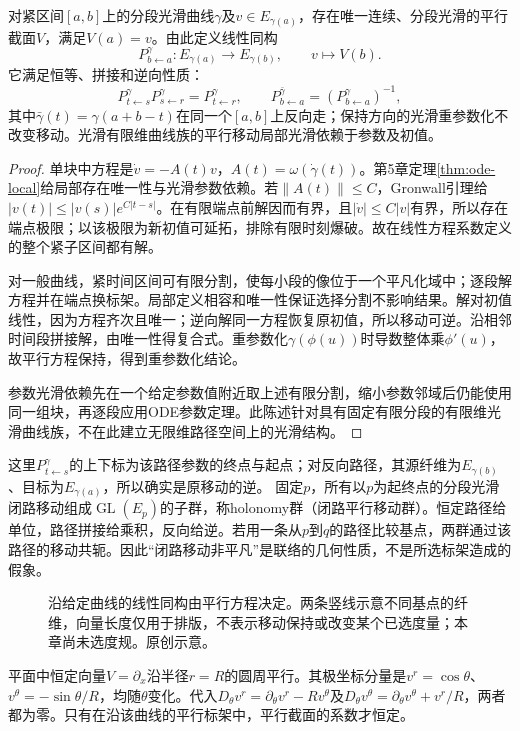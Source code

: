 \begin{theorem}[平行移动的存在与基本性质]\label{thm:parallel-transport}
对紧区间$[a,b]$上的分段光滑曲线$\gamma$及$v\in E_{\gamma(a)}$，存在唯一连续、分段光滑的平行截面$V$，满足$V(a)=v$。由此定义线性同构
\[
 P^\gamma_{b\leftarrow a}:E_{\gamma(a)}\to E_{\gamma(b)},\qquad v\mapsto V(b).
\]
它满足恒等、拼接和逆向性质：
\[
 P^\gamma_{t\leftarrow s}P^\gamma_{s\leftarrow r}=P^\gamma_{t\leftarrow r},
 \qquad P^{\bar\gamma}_{b\leftarrow a}=(P^\gamma_{b\leftarrow a})^{-1},
\]
其中$\bar\gamma(t)=\gamma(a+b-t)$在同一个$[a,b]$上反向走；保持方向的光滑重参数化不改变移动。光滑有限维曲线族的平行移动局部光滑依赖于参数及初值。
\end{theorem}
\begin{proof}
单块中方程是$\dot v=-A(t)v$，$A(t)=\omega(\dot\gamma(t))$。第5章定理\ref{thm:ode-local}给局部存在唯一性与光滑参数依赖。若$\|A(t)\|\leq C$，Gronwall引理给$|v(t)|\leq|v(s)|e^{C|t-s|}$。在有限端点前解因而有界，且$|\dot v|\leq C|v|$有界，所以存在端点极限；以该极限为新初值可延拓，排除有限时刻爆破。故在线性方程系数定义的整个紧子区间都有解。

对一般曲线，紧时间区间可有限分割，使每小段的像位于一个平凡化域中；逐段解方程并在端点换标架。局部定义相容和唯一性保证选择分割不影响结果。解对初值线性，因为方程齐次且唯一；逆向解同一方程恢复原初值，所以移动可逆。沿相邻时间段拼接解，由唯一性得复合式。重参数化$\gamma(\phi(u))$时导数整体乘$\phi'(u)$，故平行方程保持，得到重参数化结论。

参数光滑依赖先在一个给定参数值附近取上述有限分割，缩小参数邻域后仍能使用同一组块，再逐段应用ODE参数定理。此陈述针对具有固定有限分段的有限维光滑曲线族，不在此建立无限维路径空间上的光滑结构。
\end{proof}
这里$P^\gamma_{t\leftarrow s}$的上下标为该路径参数的终点与起点；对反向路径，其源纤维为$E_{\gamma(b)}$、目标为$E_{\gamma(a)}$，所以确实是原移动的逆。
固定$p$，所有以$p$为起终点的分段光滑闭路移动组成$\operatorname{GL}(E_p)$的子群，称holonomy群（闭路平行移动群）。恒定路径给单位，路径拼接给乘积，反向给逆。若用一条从$p$到$q$的路径比较基点，两群通过该路径的移动共轭。因此“闭路移动非平凡”是联络的几何性质，不是所选标架造成的假象。
\begin{figure}[htbp]
\centering
\caption{沿给定曲线的线性同构由平行方程决定。两条竖线示意不同基点的纤维，向量长度仅用于排版，不表示移动保持或改变某个已选度量；本章尚未选度规。原创示意。}
\label{fig:parallel-transport}
\end{figure}

\begin{example}[平行不等于分量恒定]
平面中恒定向量$V=\partial_x$沿半径$r=R$的圆周平行。其极坐标分量是$v^r=\cos\theta$、$v^\theta=-\sin\theta/R$，均随$\theta$变化。代入$D_\theta v^r=\partial_\theta v^r-Rv^\theta$及$D_\theta v^\theta=\partial_\theta v^\theta+v^r/R$，两者都为零。只有在沿该曲线的平行标架中，平行截面的系数才恒定。
\end{example}

